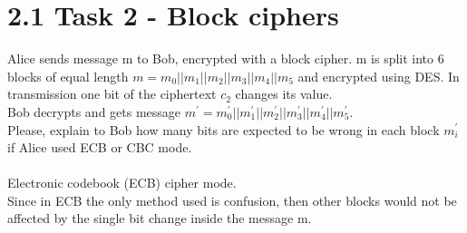 \documentclass{article}
\begin{document}
\section{2.1 Task 2 - Block ciphers} 
Alice sends message m to Bob, encrypted with a block cipher. 
m is split into 6 blocks of equal length 
$m = m_0||m_1||m_2||m_3||m_4||m_5$ and encrypted using DES. 
In transmission one bit of the ciphertext $c_2$ changes its value.
\\Bob decrypts and gets
message $m^{'} = m^{'}_0||m^{'}_1||m^{'}_2||m^{'}_3||m^{'}_4||m^{'}_5$. 
\\Please, explain to 
Bob how many bits are expected to be wrong in each block $m^{'}_i$
if Alice used ECB or CBC mode.
\\\\
Electronic codebook (ECB) cipher mode.
\\
Since in ECB the only method used is confusion, then other blocks would not be affected by the single bit change inside
the message m. 
\end{document}
